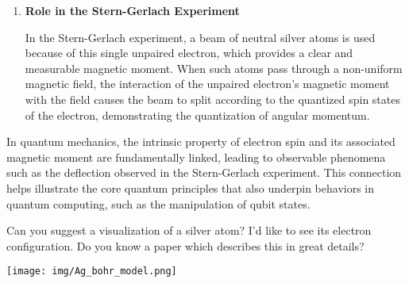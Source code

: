 \begin{airesult}
\begin{enumerate}
\item \textbf{Role in the Stern-Gerlach Experiment}

In the Stern-Gerlach experiment, a beam of neutral silver atoms is used because of this single
unpaired electron, which provides a clear and measurable magnetic moment. When such atoms pass
through a non-uniform magnetic field, the interaction of the unpaired electron’s magnetic moment
with the field causes the beam to split according to the quantized spin states of the electron,
demonstrating the quantization of angular momentum.

\end{enumerate}

\vsp

In quantum mechanics, the intrinsic property of electron spin and its associated magnetic moment are
fundamentally linked, leading to observable phenomena such as the deflection observed in the
Stern-Gerlach experiment. This connection helps illustrate the core quantum principles that also
underpin behaviors in quantum computing, such as the manipulation of qubit states.
\end{airesult}


\begin{ai}
Can you suggest a visualization of a silver atom? I'd like to see its electron configuration. Do you
know a paper which describes this in great details?
\end{ai}

\begin{center}
\texttt{[image: img/Ag\_bohr\_model.png]}
\end{center}

